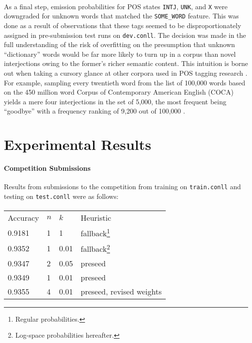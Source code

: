 \documentclass[11pt,a4paper]{article}
\begin{document}
\paragraph{}
As a final step, emission probabilities for POS states \texttt{INTJ}, \texttt{UNK},
and \texttt{X} were downgraded for unknown words that matched the \texttt{SOME\_WORD}
feature. This was done as a result of observations that these tags seemed to be
disproportionately assigned in pre-submission test runs on \texttt{dev.conll}.
The decision was made in the full understanding of the risk of overfitting on the
presumption that unknown ``dictionary'' words would be far more likely to turn up
in a corpus than novel interjections owing to the former's richer semantic content.
This intuition is borne out when taking a cursory glance at other corpora \cite{WFD100K}
used in POS tagging research \cite{CLAWS7} \cite{BrysbaertNewKeuleers}. For example,
sampling every twentieth word from the list of 100,000 words based on the 450 million word
Corpus of Contemporary American English (COCA) yields a mere four interjections in the set of
5,000, the most frequent being ``goodbye'' with a frequency ranking of 9,200 out of 100,000 \cite{COCA5K}.

\section{Experimental Results}

\paragraph{Competition Submissions}
Results from submissions to the competition from training on \texttt{train.conll}
and testing on \texttt{test.conll} were as follows:

\paragraph{}
{\small
\begin{tabular}{llll}
  Accuracy & $n$ & $k$ & Heuristic \\
  0.9181 & 1 & 1 & fallback\footnote{Regular probabilities.} \\
  0.9352 & 1 & 0.01 & fallback\footnote{Log-space probabilities hereafter.} \\
  0.9347 & 2 & 0.05 & preseed \\
  0.9349 & 1 & 0.01 & preseed \\
  0.9355 & 4 & 0.01 & preseed, revised weights
\end{tabular}}
\end{document}
